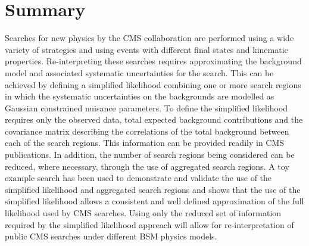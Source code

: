 \section{Summary}
\label{sec:conclusions}
Searches for new physics by the CMS collaboration are performed using a wide variety of 
strategies and using events with different final states and kinematic properties. 
Re-interpreting these searches requires approximating the background model
and associated systematic uncertainties for the search. This can be 
achieved by defining a simplified likelihood combining one or more search regions in which the systematic 
uncertainties on the backgrounds are modelled  as Gaussian  constrained nuisance parameters. 
To define the simplified likelihood requires only the observed data, total expected background contributions and 
the covariance matrix describing the correlations of the total background between each of the search regions. 
This information can be provided readily in CMS publications. In addition, the number of search regions being 
considered can be reduced, where necessary, through the use of aggregated search regions. 
A toy example search has been used to demonstrate and validate the use of the simplified likelihood and aggregated search 
regions and shows that the use of the simplified likelihood allows a consistent and well defined approximation of the 
full likelihood used by CMS searches. Using only the reduced set of information required by the simplified likelihood 
appreach will allow for re-interpretation of public CMS searches under different BSM physics models.

